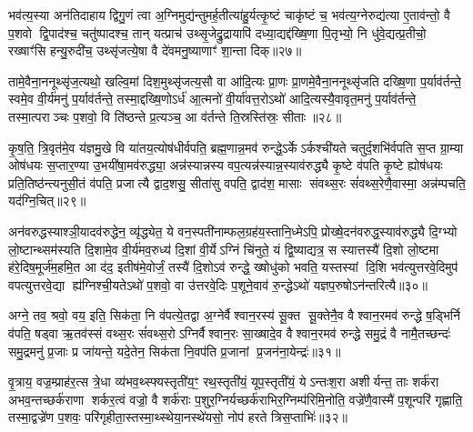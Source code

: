 भव॑त्य॒स्या अन॑तिदाहाय द्विगु॒णं त्वा अ॒ग्निमुद्य॑न्तुमर्\mbox{}ह॒तीत्या॑हु॒र्यत्कृ॒ष्टं चाकृ॑ष्टं च॒ भव॑त्य॒ग्नेरुद्य॑त्या ए॒ताव॑न्तो॒ वै प॒शवो द्वि॒पाद॑श्च॒ चतु॑ष्पादश्च॒ तान् यत्प्राच॑ उथ्सृ॒जेद्रु॒द्रायापि॑ दध्या॒द्यद्द॑ख्षि॒णा पि॒तृभ्यो॒ नि धु॑वे॒द्यत्प्र॒तीचो॒ रख्षाꣳ॑सि हन्यु॒रुदी॑च॒ उथ्सृ॑जत्ये॒षा वै दे॑वमनु॒ष्याणाꣳ॑ शा॒न्ता दिक्॥२७॥

तामे॒वैना॒ननूथ्सृ॑ज॒त्यथो॒ खल्वि॒मां दिश॒मुथ्सृ॑जत्य॒सौ वा आ॑दि॒त्यः प्रा॒णः प्रा॒णमे॒वैना॒ननूथ्सृ॑जति दख्षि॒णा प॒र्याव॑र्तन्ते॒ स्वमे॒व वी॒र्य॑मनु॑ प॒र्याव॑र्तन्ते॒ तस्मा॒द्दख्षि॒णोऽर्ध॑ आ॒त्मनो॑ वी॒र्या॑वत्त॒रोऽथो॑ आदि॒त्यस्यै॒वावृत॒मनु॑ प॒र्याव॑र्तन्ते॒ तस्मा॒त्पराञ्चः प॒शवो॒ वि ति॑ष्ठन्ते प्र॒त्यञ्च॒ आ व॑र्तन्ते ति॒स्रस्ति॑स्रः॒ सीताः॥२८॥

कृ॒ष॒ति॒ त्रि॒वृत॑मे॒व य॑ज्ञमु॒खे वि या॑तय॒त्योष॑धीर्वपति॒ ब्रह्म॒णान्न॒मव॑ रुन्द्धे॒ऽर्केऽर्कश्ची॑यते चतुर्द॒शभि॑र्वपति स॒प्त ग्रा॒म्या ओष॑धयः स॒प्तार॒ण्या उ॒भयी॑षा॒मव॑रुद्ध्या॒ अन्न॑स्यान्नस्य वप॒त्यन्न॑स्यान्न॒स्याव॑रुद्ध्यै कृ॒ष्टे व॑पति कृ॒ष्टे ह्योष॑धयः प्रति॒तिष्ठ॑न्त्यनुसी॒तं व॑पति॒ प्रजात्यै द्वाद॒शसु॒ सीता॑सु वपति॒ द्वाद॑श॒ मासाः संवथ्स॒रः सं॑वथ्स॒रेणै॒वास्मा॒ अन्न॑म्पचति॒ यद॑ग्नि॒चित्॥२९॥

अन॑वरुद्धस्याश्ञी॒यादव॑रुद्धेन॒ व्यृ॑द्ध्येत॒ ये वन॒स्पती॑नाम्फल॒ग्रह॑य॒स्तानि॒ध्मेऽपि॒ प्रोख्षे॒दन॑वरुद्ध॒स्याव॑रुद्ध्यै दि॒ग्भ्यो लो॒ष्टान्थ्सम॑स्यति दि॒शामे॒व वी॒र्य॑मव॒रुध्य॑ दि॒शां वी॒र्येऽग्निं चि॑नुते॒ यं द्वि॒ष्याद्यत्र॒ स स्यात्तस्यै॑ दि॒शो लो॒ष्टमा ह॑रे॒दिष॒मूर्ज॑म॒हमि॒त आ द॑द॒ इतीष॑मे॒वोर्जं॒ तस्यै॑ दि॒शोऽव॑ रुन्द्धे॒ ख्षोधु॑को भवति॒ यस्तस्यां दि॒शि भव॑त्युत्तरवे॒दिमुप॑ वपत्युत्तरवे॒द्या ह्य॑ग्निश्ची॒यतेऽथो॑ प॒शवो॒ वा उ॑त्तरवे॒दिः प॒शूने॒वाव॑ रु॒न्द्धेऽथो॑ यज्ञप॒रुषोऽन॑न्तरित्यै॥३०॥

{\anuvakamend[{च॒ भ॒व॒त्ये॒ताव॒द्वै पुरु॑षे वी॒र्यं॑ यत्कृ॒ष्टञ्चाकृ॑ष्टञ्च॒ दिख्सीता॑ अग्नि॒चिदव॒ पञ्च॑विशतिश्च॥५॥}]}

अग्ने॒ तव॒ श्रवो॒ वय॒ इति॒ सिक॑ता॒ नि व॑पत्ये॒तद्वा अ॒ग्नेर्वैश्वान॒रस्य॑ सू॒क्त सू॒क्तेनै॒व वैश्वान॒रमव॑ रुन्द्धे ष॒ड्भिर्नि व॑पति॒ षड्वा ऋ॒तव॑स्सं वथ्स॒रः सं॑वथ्स॒रोऽग्निर्वैश्वान॒रः सा॒ख्षादे॒व वैश्वान॒रमव॑ रुन्द्धे समु॒द्रं वै नामै॒तच्छन्दः॑ समु॒द्रमनु॑ प्र॒जाः प्र जा॑यन्ते॒ यदे॒तेन॒ सिक॑ता नि॒वप॑ति प्र॒जानां प्र॒जन॑ना॒येन्द्रः॑॥३१॥

वृ॒त्राय॒ वज्र॒म्प्राह॑र॒त्स त्रे॒धा व्य॑भव॒थ्स्फ्यस्तृती॑य॒ꣳ॒ रथ॒स्तृती॑यं॒ यूप॒स्तृती॑यं॒ येऽन्तःश॒रा अशीर्यन्त॒ ताः शर्क॑रा अभव॒न्तच्छर्क॑राणा शर्कर॒त्वं वज्रो॒ वै शर्क॑राः प॒शुर॒ग्निर्यच्छर्क॑राभिर॒ग्निम्प॑रिमि॒नोति॒ वज्रे॑णै॒वास्मै॑ प॒शून्परि॑ गृह्णाति॒ तस्मा॒द्वज्रे॑ण प॒शवः॒ परि॑गृहीता॒स्तस्मा॒थ्स्थेया॒नस्थे॑यसो॒ नोप॑ हरते त्रिस॒प्ताभिः॑॥३२॥

